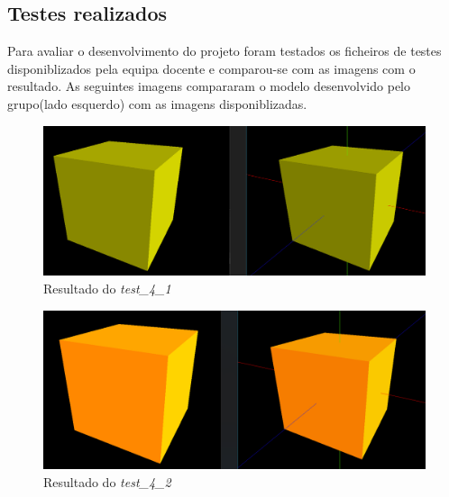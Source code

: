 \documentclass[runningheads]{llncs}
\begin{document}
    
    
    

    \subsection{Testes realizados}
    Para avaliar o desenvolvimento do projeto foram testados os ficheiros de testes disponiblizados
    pela equipa docente e comparou-se com as imagens com o resultado. As seguintes imagens compararam
    o modelo desenvolvido pelo grupo(lado esquerdo) com as imagens disponiblizadas.

    \begin{landscape}
        \begin{figure}
            \centering
            \includegraphics[width=\linewidth]{assets/testes/teste_4_1.png}
            \caption{Resultado do \textit{test\_4\_1}} \label{fig:teste_4_1}
        \end{figure}
    \end{landscape}

    \begin{landscape}
        \begin{figure}
            \centering
            \includegraphics[width=\linewidth]{assets/testes/teste_4_2.png}
            \caption{Resultado do \textit{test\_4\_2}} \label{fig:teste_4_2}
        \end{figure}
    \end{landscape}
\end{document}
